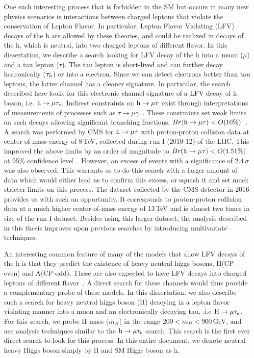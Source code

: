 One such interesting process that is forbidden in the SM but occurs in many new physics scenarios is interactions between charged leptons that violate the conservation of Lepton Flavor. In particular, Lepton Flavor Violating (LFV) decays of the h are allowed by these theories, and could be realized in decays of the h, which is neutral, into two charged leptons of different flavor. In this dissertation, we describe a search looking for LFV decay of the h into a muon ($\mu$) and a tau lepton ($\tau$). The tau lepton is short-lived and can further decay hadronically ($\tau_{h}$) or into a electron. Since we can detect electrons better than tau leptons, the latter channel has a cleaner signature. In particular, the search described here looks for this electronic channel signature of a LFV decay of h boson, i.e. $\text{h} \to \mu \tau_{e}$. Indirect constraints on $\text{h} \to \mu \tau$ exist through interpretations of measurements of processes such as $\tau \rightarrow \mu \gamma$~\cite{kanemura}. These constraints set weak limits on such decays allowing significant branching fractions; $Br(\text{h} \to \mu \tau)<O(10\%)$~\cite{Blankenburg:2012ex,Harnik:2012pb}. A search was performed by CMS for $\text{h} \to \mu \tau$ with proton-proton collision data at center-of-mass energy of 8\,TeV, collected during run I (2010-12) of the LHC. This improved the above limits by an order of magnitude to $Br(\text{h} \to \mu \tau)<O(1.51\%)$ at 95\% confidence level~\cite{Khachatryan:2015kon}. However, an excess of events with a significance of 2.4\,$\sigma$ was also observed. This warrants us to do this search with a larger amount of data which would either lead us to confirm this excess, or squash it and set much stricter limits on this process. The dataset collected by the CMS detector in 2016 provides us with such an opportunity. It corresponds to proton-proton collision data at a much higher center-of-mass energy of 13\,TeV and is almost two times in size of the run I dataset. Besides using this larger dataset, the analysis described in this thesis improves upon previous searches by introducing multivariate techniques.

An interesting common feature of many of the models that allow LFV decays of the h is that they predict the existence of heavy neutral higgs bosons, H(CP-even) and A(CP-odd). These are also expected to have LFV decays into charged leptons of different flavor~\cite{PhysRevD.93.055021}. A direct search for these channels would thus provide a complementary probe of these models. In this dissertation, we also describe such a search for heavy neutral higgs boson (H) deacying in a lepton flavor violating manner into a muon and an electronically decaying tau, .i.e $\text{H} \to \mu \tau_{e}$. For this search, we probe H mass ($m_H$) in the range $200<m_H<900$\,GeV, and use analysis techniques similar to the $\text{h} \to \mu \tau_{e}$ search. This search is the first ever direct search to look for this process. In this entire document, we denote neutral heavy Higgs boson simply by H and SM Higgs boson as h.

